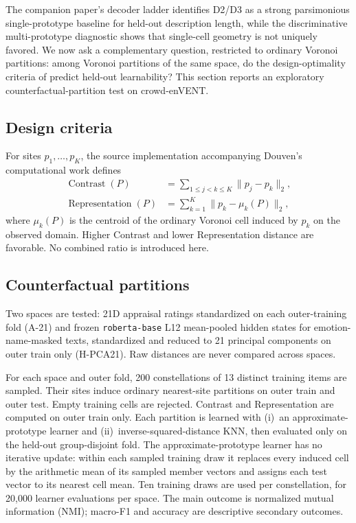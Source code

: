 \documentclass[11pt]{article}
\begin{document}
The companion paper's decoder ladder identifies D2/D3 as a strong parsimonious single-prototype baseline for held-out description length, while the discriminative multi-prototype diagnostic shows that single-cell geometry is not uniquely favored. We now ask a complementary question, restricted to ordinary Voronoi partitions: among Voronoi partitions of the same space, do the design-optimality criteria of \citet{douven-gardenfors-2020} predict held-out learnability? This section reports an exploratory counterfactual-partition test on crowd-enVENT.

\subsection{Design criteria}

For sites $p_1,\ldots,p_K$, the source implementation accompanying Douven's computational work \citep{douven-code-2023} defines
\begin{align}
  \operatorname{Contrast}(P)
    &= \sum_{1\leq j<k\leq K}\lVert p_j-p_k\rVert_2,\\
  \operatorname{Representation}(P)
    &= \sum_{k=1}^{K}\lVert p_k-\mu_k(P)\rVert_2,
\end{align}
where $\mu_k(P)$ is the centroid of the ordinary Voronoi cell induced by $p_k$ on the observed domain. Higher Contrast and lower Representation distance are favorable. No combined ratio is introduced here.

\subsection{Counterfactual partitions}

Two spaces are tested: 21D appraisal ratings standardized on each outer-training fold (A-21) and frozen \texttt{roberta-base} L12 mean-pooled hidden states for emotion-name-masked texts, standardized and reduced to 21 principal components on outer train only (H-PCA21). Raw distances are never compared across spaces.

For each space and outer fold, 200 constellations of 13 distinct training items are sampled. Their sites induce ordinary nearest-site partitions on outer train and outer test. Empty training cells are rejected. Contrast and Representation are computed on outer train only. Each partition is learned with (i)~an approximate-prototype learner and (ii)~inverse-squared-distance KNN, then evaluated only on the held-out group-disjoint fold. The approximate-prototype learner has no iterative update: within each sampled training draw it replaces every induced cell by the arithmetic mean of its sampled member vectors and assigns each test vector to its nearest cell mean. Ten training draws are used per constellation, for 20{,}000 learner evaluations per space. The main outcome is normalized mutual information (NMI); macro-F1 and accuracy are descriptive secondary outcomes.
\end{document}
